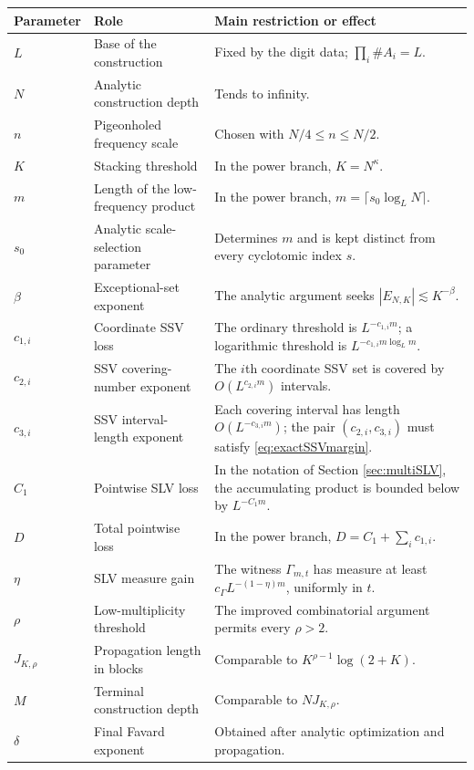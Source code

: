 \documentclass[12pt]{amsart}
\numberwithin{equation}{section}
\begin{document}
\begin{center}
\small
\renewcommand{\arraystretch}{1.32}
\begin{tabularx}{\textwidth}{@{}>{\raggedright\arraybackslash}p{}
  >{\raggedright\arraybackslash}p{}X@{}}
\toprule
Parameter & Role & Main restriction or effect\\
\midrule
$L$ & Base of the construction & Fixed by the digit data; $\prod_i\#A_i=L$.\\
$N$ & Analytic construction depth & Tends to infinity.\\
$n$ & Pigeonholed frequency scale & Chosen with $N/4\leq n\leq N/2$.\\
$K$ & Stacking threshold & In the power branch, $K=N^\kappa$.\\
$m$ & Length of the low-frequency product & In the power branch, $m=\lceil s_0\log_LN\rceil$.\\
$s_0$ & Analytic scale-selection parameter & Determines $m$ and is kept distinct from every cyclotomic index $s$.\\
$\beta$ & Exceptional-set exponent & The analytic argument seeks $|E_{N,K}|\lesssim K^{-\beta}$.\\
$c_{1,i}$ & Coordinate SSV loss & The ordinary threshold is $L^{-c_{1,i}m}$; a logarithmic threshold is $L^{-c_{1,i}m\log_Lm}$.\\
$c_{2,i}$ & SSV covering-number exponent & The $i$th coordinate SSV set is covered by $O(L^{c_{2,i}m})$ intervals.\\
$c_{3,i}$ & SSV interval-length exponent & Each covering interval has length $O(L^{-c_{3,i}m})$; the pair $(c_{2,i},c_{3,i})$ must satisfy \eqref{eq:exactSSVmargin}.\\
$C_1$ & Pointwise SLV loss & In the notation of Section \ref{sec:multiSLV}, the accumulating product is bounded below by $L^{-C_1m}$.\\
$D$ & Total pointwise loss & In the power branch, $D=C_1+\sum_i c_{1,i}$.\\
$\eta$ & SLV measure gain & The witness $\Gamma_{m,t}$ has measure at least $c_\Gamma L^{-(1-\eta)m}$, uniformly in $t$.\\
$\rho$ & Low-multiplicity threshold & The improved combinatorial argument permits every $\rho>2$.\\
$J_{K,\rho}$ & Propagation length in blocks & Comparable to $K^{\rho-1}\log(2+K)$.\\
$M$ & Terminal construction depth & Comparable to $NJ_{K,\rho}$.\\
$\delta$ & Final Favard exponent & Obtained after analytic optimization and propagation.\\
\bottomrule
\end{tabularx}
\end{center}
\end{document}
